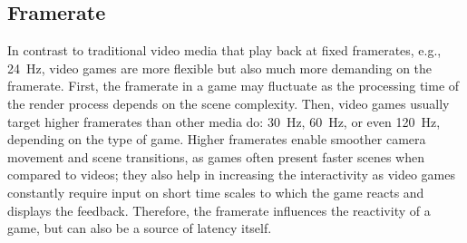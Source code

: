 \subsection{Framerate}
\label{sec:framerate}

In contrast to traditional video media that play back at fixed framerates, e.g., \SI{24}{\hertz}, video games are more flexible but also much more demanding on the framerate. First, the framerate in a game may fluctuate as the processing time of the render process depends on the scene complexity.
Then, video games usually target higher framerates than other media do: \SI{30}{\hertz}, \SI{60}{\hertz}, or even \SI{120}{\hertz}, depending on the type of game. Higher framerates enable smoother camera movement and scene transitions, as games often present faster scenes when compared to videos; they also help in increasing the interactivity as video games constantly require input on short time scales to which the game reacts and displays the feedback. Therefore, the framerate influences the reactivity of a game, but can also be a source of latency itself.





